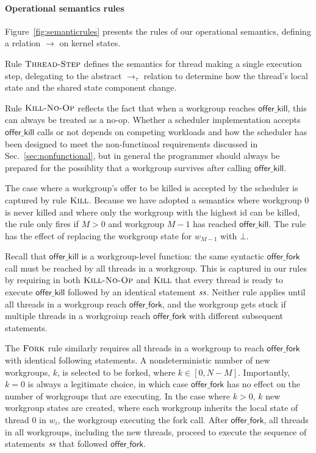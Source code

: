 \documentclass[numbers,nocopyrightspace,10pt]{sigplanconf}
\newcommand{\myfiglong}{Figure~}
\newcommand{\mysec}{Sec.~}
\newcommand{\offerfork}{\mathsf{offer\_fork}}
\newcommand{\offerkill}{\mathsf{offer\_kill}}
\begin{document}
\paragraph{Operational semantics rules}

\myfiglong\ref{fig:semanticrules} presents the rules of our
operational semantics, defining a relation $\rightarrow$ on kernel
states.

Rule $\textsc{Thread-Step}$ defines the semantics for thread making a
single execution step, delegating to the abstract $\rightarrow_{\tau}$
relation to determine how the thread's local state and the shared
state component change.

Rule $\textsc{Kill-No-Op}$ reflects the fact that when a workgroup
reaches $\offerkill$, this can always be treated as a no-op.  Whether
a scheduler implementation accepts $\offerkill$ calls or not depends
on competing workloads and how the scheduler has been designed to meet
the non-functinoal requirements discussed in
\mysec\ref{sec:nonfunctional}, but in general the programmer should
always be prepared for the possiblity that a workgroup survives after
calling $\offerkill$.

The case where a workgroup's offer to be killed is accepted by the
scheduler is captured by rule $\textsc{Kill}$.  Because we have
adopted a semantics where workgroup 0 is never killed and where only
the workgroup with the highest id can be killed, the rule only fires
if $M > 0$ and workgroup $M-1$ has reached $\offerkill$.  The rule has
the effect of replacing the workgroup state for $w_{M-1}$
with $\bot$.

Recall that $\offerkill$ is a workgroup-level function: the same
syntactic $\offerfork$ call must be reached by all threads in a
workgroup.  This is captured in our rules by requiring in both
$\textsc{Kill-No-Op}$ and $\textsc{Kill}$ that every thread is ready
to execute $\offerkill$ followed by an identical statement $\mathit{ss}$.
Neither rule applies until all threads in a workgroup reach
$\offerfork$, and the workgroup gets stuck if multiple threads in a
workgroiup reach $\offerfork$ with different subsequent statements.

The $\textsc{Fork}$ rule similarly requires all threads in a workgroup
to reach $\offerfork$ with identical following statements.  A
nondeterministic number of new workgroups, $k$, is selected to be
forked, where $k \in [0, N-M]$.  Importantly, $k=0$ is always a
legitimate choice, in which case $\offerfork$ has no effect on the
number of workgroups that are executing.  In the case where $k > 0$,
$k$ new workgroup states are created, where each workgroup inherits
the local state of thread 0 in $w_i$, the workgroup executing the fork
call.  After $\offerfork$, all threads in all workgroups, including
the new threads, proceed to execute the sequence of statements $\mathit{ss}$
that followed $\offerfork$.
\end{document}
